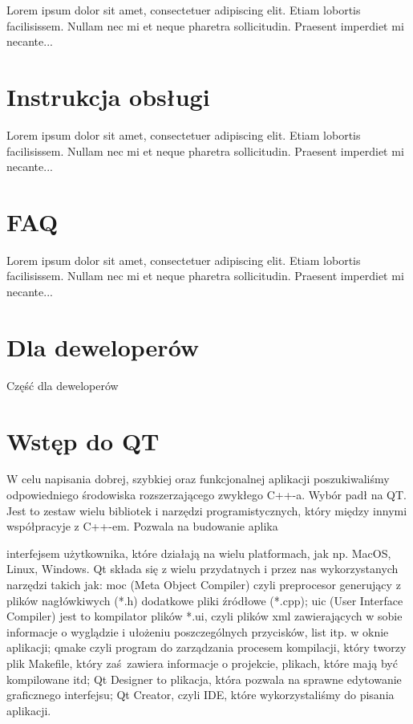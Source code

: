 \documentclass{article}
\begin{document}
Lorem ipsum dolor sit amet, consectetuer adipiscing elit.  
Etiam lobortis facilisissem.  Nullam nec mi et neque pharetra 
sollicitudin.  Praesent imperdiet mi necante...

\section{Instrukcja obsługi}
 
Lorem ipsum dolor sit amet, consectetuer adipiscing elit.  
Etiam lobortis facilisissem.  Nullam nec mi et neque pharetra 
sollicitudin.  Praesent imperdiet mi necante...

\section{FAQ}
 
Lorem ipsum dolor sit amet, consectetuer adipiscing elit.  
Etiam lobortis facilisissem.  Nullam nec mi et neque pharetra 
sollicitudin.  Praesent imperdiet mi necante...

\section*{Dla deweloperów}
 
Część dla deweloperów

\section{Wstęp do QT}
 
W celu napisania dobrej, szybkiej oraz funkcjonalnej aplikacji poszukiwaliśmy odpowiedniego środowiska rozszerzającego zwykłego C++-a. Wybór padł na QT. Jest to zestaw wielu bibliotek i narzędzi programistycznych, który między innymi współpracyje z C++-em. Pozwala na budowanie aplika

\secgraficznym interfejsem użytkownika, które działają na wielu platformach, jak np. MacOS, Linux, Windows. Qt składa się z wielu przydatnych i przez nas wykorzystanych narzędzi takich jak: moc (Meta Object Compiler) czyli preprocesor generujący z plików nagłówkiwych (*.h) dodatkowe pliki źródłowe (*.cpp); uic (User Interface Compiler) jest to kompilator plików *.ui, czyli plików xml zawierających w sobie informacje o wyglądzie i ułożeniu poszczególnych przycisków, list itp. w oknie aplikacji; qmake czyli program do zarządzania procesem kompilacji, który tworzy plik Makefile, który zaś zawiera informacje o projekcie, plikach, które mają być kompilowane itd; Qt Designer to plikacja, która pozwala na sprawne edytowanie graficznego interfejsu; Qt Creator, czyli IDE, które wykorzystaliśmy do pisania aplikacji.
\end{document}
